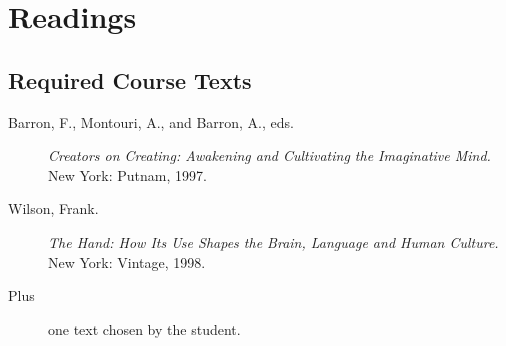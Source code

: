 \documentclass{report}
\begin{document}
\section{Readings}
\subsection{Required Course Texts}

\begin{description}
\item [Barron, F., Montouri, A., and Barron, A., eds.] \textit{Creators on Creating: Awakening and Cultivating the Imaginative Mind.} 
\\New York: Putnam, 1997.
\item[Wilson, Frank.] \textit{The Hand: How Its Use Shapes the Brain, Language and Human Culture.}
\\New York: Vintage, 1998.
\item[Plus] {one text chosen by the student.}
\end{description}
\end{document}
